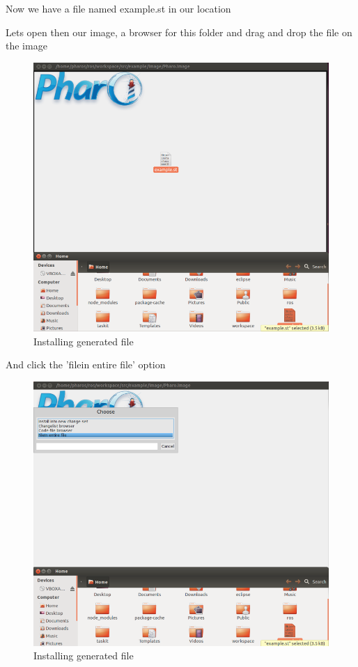 \documentclass[a4paper,10pt,twoside]{book}
\begin{document}
					
					Now we have a file named example.st in our location
					
					Lets open then our image, a browser for this folder and drag and drop the file on the image
					
					\begin{figure}[!htbp]
				  		\centering
					    		\includegraphics[width=1\textwidth]{RepositoryDragAndDrop.png}		
							\caption{Installing generated file}
						\centering
					\end{figure}
					
					
					And click the 'filein entire file' option
					
					\begin{figure}[!htbp]
				  		\centering
					    		\includegraphics[width=1\textwidth]{FileInEntireFile.png}		
							\caption{Installing generated file}
						\centering
					\end{figure} 
					
\end{document}
